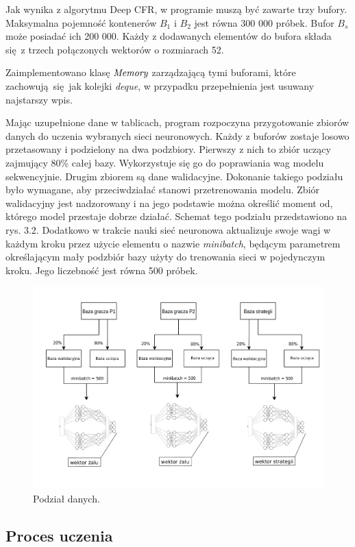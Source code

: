 \documentclass[12pt,oneside,a4paper]{report}
\begin{document}
Jak wynika z algorytmu Deep CFR, w programie muszą być zawarte trzy bufory.
Maksymalna pojemność kontenerów $B_{1}$ i $B_{2}$ jest równa 300 000 próbek.
Bufor $B_{s}$ może posiadać ich 200 000. Każdy z dodawanych elementów do bufora składa się z
trzech połączonych wektorów o rozmiarach 52.

Zaimplementowano klasę $\emph{Memory}$ zarządzającą tymi buforami, które zachowują się jak 
kolejki \emph{deque}, w przypadku przepełnienia jest usuwany najstarszy wpis.

Mając uzupełnione dane w tablicach, program rozpoczyna przygotowanie zbiorów danych do uczenia
wybranych
sieci neuronowych. Każdy z buforów zostaje losowo przetasowany i podzielony na dwa podzbiory.
Pierwszy z nich to zbiór uczący zajmujący 80\% całej bazy. Wykorzystuje się go do poprawiania wag modelu sekwencyjnie.
Drugim zbiorem
są dane walidacyjne. Dokonanie takiego podziału było wymagane, aby przeciwdziałać stanowi
przetrenowania modelu. Zbiór walidacyjny jest nadzorowany i na jego podstawie można określić 
moment od, którego model przestaje dobrze działać. Schemat tego
podziału przedstawiono na rys. 3.2. 
Dodatkowo w trakcie nauki sieć neuronowa aktualizuje swoje wagi w każdym kroku przez użycie elementu o nazwie
\emph{minibatch}, będącym parametrem określającym
mały podzbiór bazy użyty do trenowania sieci w pojedynczym kroku. Jego liczebność jest równa 500
próbek.

\begin{figure}[!ht]
  \centering
  \includegraphics[width=1\textwidth]{./img/bzd.pdf}
  \caption{Podział danych.}
\end{figure}


\subsection{Proces uczenia}
\end{document}
